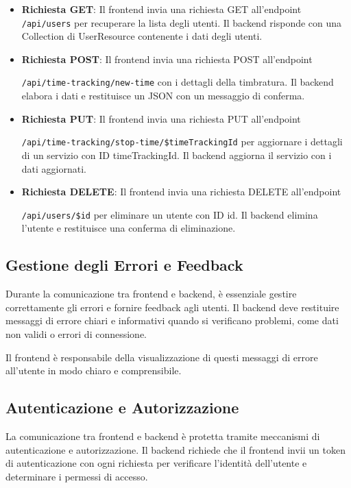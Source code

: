 \documentclass[twoside]{supsistudent}
\begin{document}
\begin{itemize}
  \item \textbf{Richiesta GET}: Il frontend invia una richiesta GET all'endpoint \texttt{/api/users} per recuperare la lista degli utenti. Il backend risponde con una Collection di UserResource contenente i dati degli utenti.
  \item \textbf{Richiesta POST}: Il frontend invia una richiesta POST all'endpoint

        \texttt{/api/time-tracking/new-time} con i dettagli della timbratura. Il backend elabora i dati e restituisce un JSON con un messaggio di conferma.
  \item \textbf{Richiesta PUT}: Il frontend invia una richiesta PUT all'endpoint

        \texttt{/api/time-tracking/stop-time/\$timeTrackingId} per aggiornare i dettagli di un servizio con ID timeTrackingId. Il backend aggiorna il servizio con i dati aggiornati.
  \item \textbf{Richiesta DELETE}: Il frontend invia una richiesta DELETE all'endpoint

        \texttt{/api/users/\$id} per eliminare un utente con ID id. Il backend elimina l'utente e restituisce una conferma di eliminazione.
\end{itemize}

\subsection{Gestione degli Errori e Feedback}

Durante la comunicazione tra frontend e backend, è essenziale gestire correttamente gli errori e fornire feedback agli utenti. Il backend deve restituire messaggi di errore chiari e informativi quando si verificano problemi, come dati non validi o errori di connessione.

Il frontend è responsabile della visualizzazione di questi messaggi di errore all'utente in modo chiaro e comprensibile.

\subsection{Autenticazione e Autorizzazione}

La comunicazione tra frontend e backend è protetta tramite meccanismi di autenticazione e autorizzazione. Il backend richiede che il frontend invii un token di autenticazione con ogni richiesta per verificare l'identità dell'utente e determinare i permessi di accesso.
\end{document}
